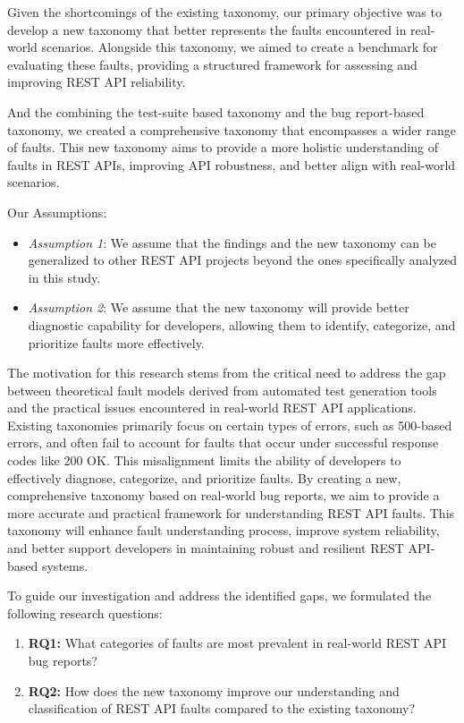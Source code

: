 \documentclass[conference]{IEEEtran}
\begin{document}
Given the shortcomings of the existing taxonomy, our primary objective was to develop a new taxonomy that better represents the faults encountered in real-world scenarios. 
Alongside this taxonomy, we aimed to create a benchmark for evaluating these faults, providing a structured framework for assessing and improving REST API reliability.

And the combining the test-suite based taxonomy and the bug report-based taxonomy, we created a comprehensive taxonomy that encompasses a wider range of faults. 
This new taxonomy aims to provide a more holistic understanding of faults in REST APIs, improving API robustness, and better align with real-world scenarios.


Our Assumptions:

\begin{itemize}
    \item 	\textit{Assumption 1}: We assume that the findings and the new taxonomy can be generalized to other REST API projects beyond the ones specifically analyzed in this study.
    \item   \textit{Assumption 2}: 	We assume that the new taxonomy will provide better diagnostic capability for developers, allowing them to identify, categorize, and prioritize faults more effectively.
\end{itemize}



The motivation for this research stems from the critical need to address the gap between theoretical fault models derived from automated test generation tools and the practical issues encountered in real-world REST API applications. 
Existing taxonomies primarily focus on certain types of errors, such as 500-based errors, and often fail to account for faults that occur under successful response codes like 200 OK. 
This misalignment limits the ability of developers to effectively diagnose, categorize, and prioritize faults. By creating a new, comprehensive taxonomy based on real-world bug reports, we aim to provide a more accurate and practical framework for understanding REST API faults. 
This taxonomy will enhance  fault understanding process, improve system reliability, and better support developers in maintaining robust and resilient REST API-based systems.

To guide our investigation and address the identified gaps, we formulated the following research questions:
\begin{enumerate}
    \item \textbf{RQ1:} What categories of faults are most prevalent in real-world REST API bug reports?
    \item \textbf{RQ2:} How does the new taxonomy improve our understanding and classification of REST API faults compared to the existing taxonomy?
\end{enumerate}
\end{document}
